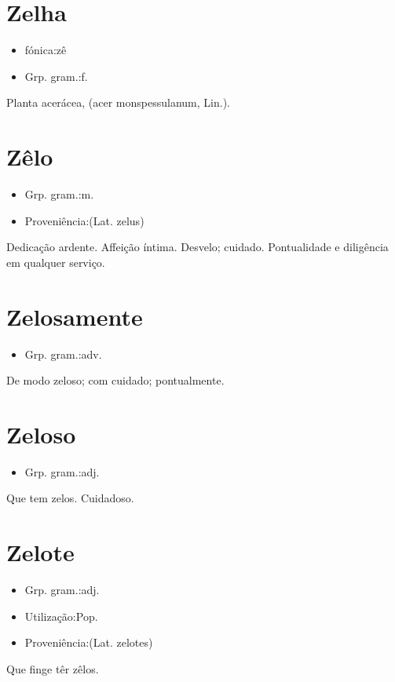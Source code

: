 \section{Zelha}
\begin{itemize}
\item {fónica:zê}
\end{itemize}
\begin{itemize}
\item {Grp. gram.:f.}
\end{itemize}
Planta acerácea, (\textunderscore acer monspessulanum\textunderscore , Lin.).
\section{Zêlo}
\begin{itemize}
\item {Grp. gram.:m.}
\end{itemize}
\begin{itemize}
\item {Proveniência:(Lat. \textunderscore zelus\textunderscore )}
\end{itemize}
Dedicação ardente.
Affeição íntima.
Desvelo; cuidado.
Pontualidade e diligência em qualquer serviço.
\section{Zelosamente}
\begin{itemize}
\item {Grp. gram.:adv.}
\end{itemize}
De modo zeloso; com cuidado; pontualmente.
\section{Zeloso}
\begin{itemize}
\item {Grp. gram.:adj.}
\end{itemize}
Que tem zelos.
Cuidadoso.
\section{Zelote}
\begin{itemize}
\item {Grp. gram.:adj.}
\end{itemize}
\begin{itemize}
\item {Utilização:Pop.}
\end{itemize}
\begin{itemize}
\item {Proveniência:(Lat. \textunderscore zelotes\textunderscore )}
\end{itemize}
Que finge têr zêlos.
